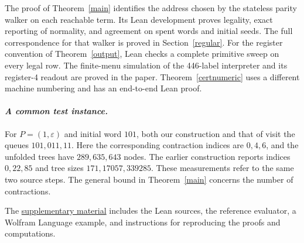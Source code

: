 The proof of Theorem~\ref{main} identifies the address chosen by the stateless parity walker on each reachable term. Its Lean development proves legality, exact reporting of normality, and agreement on spent words and initial seeds. The full correspondence for that walker is proved in Section~\ref{regular}. For the register convention of Theorem~\ref{output}, Lean checks a complete primitive sweep on every legal row. The finite-menu simulation of the 446-label interpreter and its register-4 readout are proved in the paper. Theorem~\ref{certnumeric} uses a different machine numbering and has an end-to-end Lean proof.

\paragraph{\textit{A common test instance.}}
For \(P=(1,\varepsilon)\) and initial word \(101\), both our construction and that of \cite{filin} visit the queues \(101,011,11\). Here the corresponding contraction indices are \(0,4,6\), and the unfolded trees have \(289,635,643\) nodes. The earlier construction reports indices \(0,22,85\) and tree sizes \(171,17057,339285\). These measurements refer to the same two source steps. The general bound in Theorem~\ref{main} concerns the number of contractions.

The \href{https://github.com/Bobtheotherone/pure-s-universality}{supplementary material} includes the Lean sources, the reference evaluator, a Wolfram Language example, and instructions for reproducing the proofs and computations.
